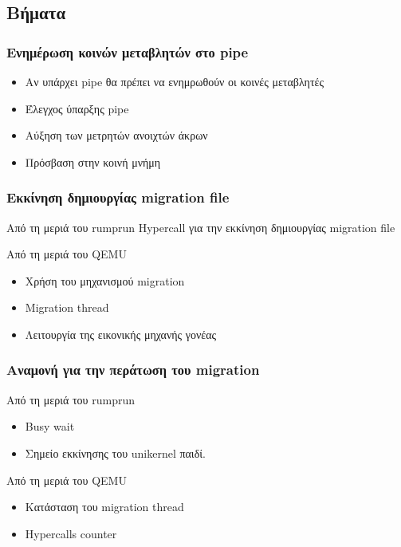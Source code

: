 \documentclass[red,slidestop,notes,compress,mathserif]{beamer}
\begin{document}
\subsection{Βήματα}

\begin{frame}
\frametitle{Ενημέρωση κοινών μεταβλητών στο pipe}
\begin{itemize}
\item Αν υπάρχει pipe θα πρέπει να ενημρωθούν οι κοινές μεταβλητές
\item Έλεγχος ύπαρξης pipe
\item Αύξηση των μετρητών ανοιχτών άκρων
\item Πρόσβαση στην κοινή μνήμη
\end{itemize}
\end{frame}

\begin{frame}
\frametitle{Εκκίνηση δημιουργίας migration file}
\begin{block}{Από τη μεριά του rumprun}
Hypercall για την εκκίνηση δημιουργίας migration file
\end{block}
\begin{block}{Από τη μεριά του QEMU}
\begin{itemize}
\item Χρήση του μηχανισμού migration
\item Migration thread
\item Λειτουργία της εικονικής μηχανής γονέας
\end{itemize}
\end{block}
\end{frame}

\begin{frame}
\frametitle{Αναμονή για την περάτωση του migration}
\begin{block}{Από τη μεριά του rumprun}
\begin{itemize}
\item Busy wait 
\item Σημείο εκκίνησης του unikernel παιδί.
\end{itemize}
\end{block}
\begin{block}{Από τη μεριά του QEMU}
\begin{itemize}
\item Κατάσταση του migration thread
\item Hypercalls counter
\end{itemize}
\end{block}
\end{frame}
\end{document}
